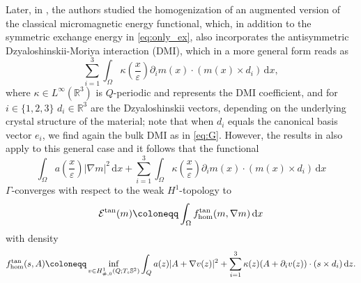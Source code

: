 \documentclass[reqno,11pt]{amsart}
\numberwithin{equation}{section}
\theoremstyle{thmlemcorr}
\numberwithin{theorem}{section}
\theoremstyle{thmlemcorr*}
\theoremstyle{defi}
\theoremstyle{remexample}
\theoremstyle{ass}
\newcommand{\R}{\mathbb{R}}
\newcommand{\1}{\mathds{1}}
\DeclareMathOperator{\curl}{curl}
\newcommand{\Om}{\Omega}
\newcommand{\veps}{\varepsilon}
\newcommand{\p}{\partial}
\newcommand{\dl}{\,\mathrm{d}}
\begin{document}
    Later, in \cite{DaD20}, the authors studied the homogenization of an augmented version of the classical micromagnetic energy functional, which, in addition to the symmetric exchange energy in \eqref{eq:only_ex}, also incorporates the antisymmetric Dzyaloshinskii-Moriya interaction (DMI), which in a more general form reads as
    \begin{equation}\label{eq:dmi_only_gen}
		\sum_{i=1}^3\int_\Om \kappa\left(\frac{x}{\veps}\right)  \p_i m(x)\cdot (m(x)\times d_i) \dl x,
	\end{equation} where \(\kappa \in L^\infty(\R^3)\) is  $Q$-periodic and represents the DMI coefficient, and for \( i\in\{1,2,3\}\)
	\(d_i\in \R^3\)  are the Dzyaloshinskii vectors, depending on the underlying crystal structure of the material; note that when $d_i$ equals the canonical basis vector $e_i$, we find again the bulk DMI as in \eqref{eq:G}. However, the results in \cite{DaD20} %
    also apply to this general case and it follows that the functional
	\begin{equation*}
		\int_\Om a\left(\frac{x}{\veps}\right)|\nabla m|^2 \dl x
		+\sum_{i=1}^3\int_\Om \kappa\left(\frac{x}{\veps}\right)  \p_i m(x)\cdot (m(x)\times d_i) \dl x
	\end{equation*}
	\(\Gamma\)-converges with respect to the weak \(H^1\)-topology to 
	\begin{equation*}
		{\mathcal{E}}^{\rm tan}(m)
		\coloneqq \int_\Om f_{\hom}^{\rm tan}(m,\nabla m) \dl x
	\end{equation*} 
	with density
	\begin{equation}\label{eq:tan_hom}
		f^{\rm tan}_{\hom}(s,A)
		\coloneqq \inf_{v \in H^1_{\#,0}(Q;T_s \mathbb{S}^2)}\int_{Q}a(z)|A+\nabla v(z)|^2 
		+\sum_{i=1}^3\kappa(z)(A+\p_i v(z))\cdot (s\times d_i) \dl z.
	\end{equation}
	
\end{document}

